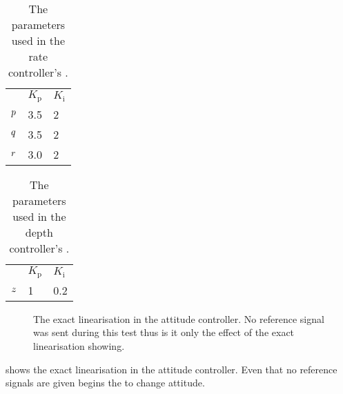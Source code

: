 \begin{table}[tbp]
  \centering
  \caption{\label{tab:parametersRate}%
    The parameters used in the rate controller's \abbrPI.}
  \begin{tabular}{l l l}
    \toprule%
       & \textbf{$K_\text{p}$} & \textbf{$K_\text{i}$}\\
    \otoprule%
    $p$  & 3.5 & 2 \\
    $q$ & 3.5 & 2 \\
    $r$   & 3.0 & 2 \\
    \bottomrule%
  \end{tabular}
\end{table}

\begin{table}[tbp]
  \centering
  \caption{\label{tab:parametersDepth}%
    The parameters used in the depth controller's \abbrPI.}
  \begin{tabular}{l l l}
    \toprule%
       & \textbf{$K_\text{p}$} & \textbf{$K_\text{i}$}\\
    \otoprule%
    $z$  & 1 & 0.2 \\
    \bottomrule%
  \end{tabular}
\end{table}

\begin{figure}
\centering
  \qquad
  \qquad
  \caption{\label{fig:ExactLinAttitude}%
  The exact linearisation in the attitude controller. No reference signal was sent during this test thus is it only the effect of the exact linearisation showing.}
\end{figure}

 shows the exact linearisation in the attitude controller. Even that no reference signals are given begins the \abbrROV to change attitude.  

